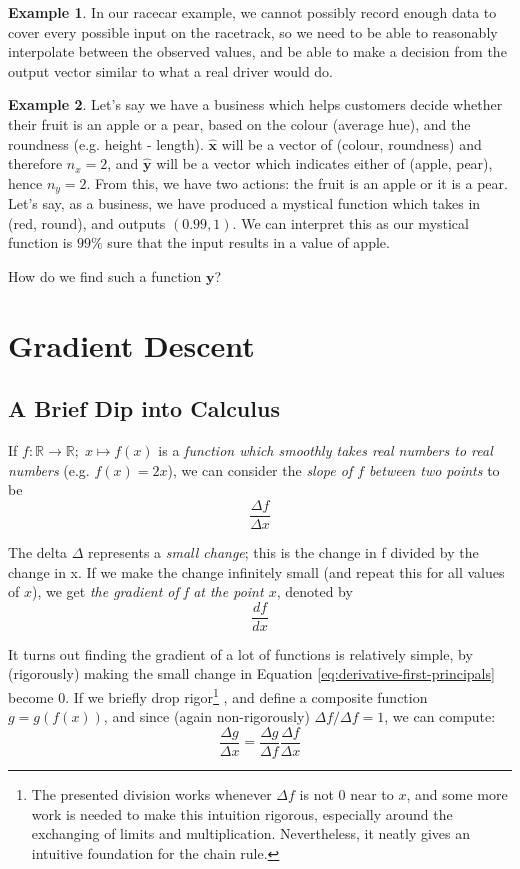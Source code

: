 \documentclass[a4paper]{article}
\theoremstyle{plain} %
\theoremstyle{definition} %
\newtheorem*{example}{Example}
\numberwithin{equation}{subsection}
\newcommand{\R}{\mathbb{R}}
\newcommand{\vy}{{\textbf{y}}}
\newcommand{\vxh}{{\widehat{\textbf{x}}}}
\newcommand{\vyh}{{\widehat{\textbf{y}}}}
\begin{document}
\begin{example}
  In our racecar example, we cannot possibly record enough data to cover every possible input on the racetrack, so we need to be able to reasonably interpolate between the observed values, and be able to make a decision from the output vector similar to what a real driver would do.
\end{example}

\begin{example}
  Let's say we have a business which helps customers decide whether their fruit is an apple or a pear,
  based on the colour (average hue), and the roundness (e.g. height - length).
  $\vxh$ will be a vector of (colour, roundness) and therefore $n_x = 2$, 
  and $\vyh$ will be a vector which indicates either of (apple, pear), hence $n_y = 2$.
  From this, we have two actions: the fruit is an apple or it is a pear.
  Let's say, as a business, we have produced a mystical function which takes in (red, round), and outputs $(0.99, 1)$. 
  We can interpret this as our mystical function is $99\%$ sure that the input results in a value of apple.
\end{example}
How do we find such a function $\vy$?
\newpage
\section{Gradient Descent}
\subsection{A Brief Dip into Calculus}

If $f:\R \rightarrow \R ; \; x \mapsto f(x)$ is a \emph{function which smoothly takes real numbers to real numbers} (e.g. $f(x) = 2x$), 
we can consider the \emph{slope of $f$ between two points} to be
\begin{equation} \label{eq:derivative-first-principals}
  \frac{\Delta f}{\Delta x}
\end{equation}

The delta $\Delta$ represents a \emph{small change}; this is the change in f divided by the change in x. 
If we make the change infinitely small (and repeat this for all values of $x$), we get \emph{the gradient of f at the point $x$}, denoted by
\[ \frac{df}{dx} \]

It turns out finding the gradient of a lot of functions is relatively simple, by (rigorously) making the small change in Equation \ref{eq:derivative-first-principals} become 0. If we briefly drop rigor\footnote{The presented division works whenever $\Delta f$ is not 0 near to $x$, and some more work is needed to make this intuition rigorous, especially around the exchanging of limits and multiplication. Nevertheless, it neatly gives an intuitive foundation for the chain rule.}
, and define a composite function $g = g(f(x))$, and since (again non-rigorously) $\Delta f / \Delta f = 1$, we can compute:
\[ \frac{\Delta g}{\Delta x} = \frac{\Delta g}{\Delta f} \frac{\Delta f}{\Delta x}\]
\end{document}
